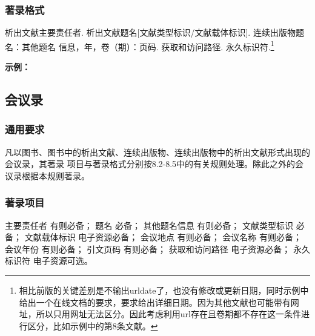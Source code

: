 \documentclass{article}
\begin{document}
\subsubsection{著录格式}

析出文献主要责任者. 析出文献题名[文献类型标识/文献载体标识]. 连续出版物题名：其他题名
信息，年，卷（期）：页码. 获取和访问路径. 永久标识符.\footnote{相比前版的关键差别是不输出urldate了，也没有修改或更新日期，同时示例中给出一个在线文档的要求，要求给出详细日期。因为其他文献也可能带有网址，所以只用网址无法区分。因此考虑利用url存在且卷期都不存在这一条件进行区分，比如示例中的第8条文献。}

\begin{refsection}



\nocite{杨洪升2013-56-75}
\nocite{丁文祥2000--}
\nocite{于潇2012-1518-1523}
\nocite{李炳穆2008-6-12}
\nocite{陈建军2010-93-93,陈缮真2022--,李幼平2010-225-228}
\nocite{张群2024在线,
张群2024出版,
Caplan1993-61-66,
Saito2006-169-176,
DESMARAIS1992-605-609,
Park2010-696-715,
Frese2013-378-398,
Myburg2014-356-362,SANTER2025ANN,SHINOTSUKA2023SAMPLE}



\textbf{示例：}

{\printbibliography[heading=none,env=indentegenv]}
\end{refsection}

\subsection{会议录}

\subsubsection{通用要求}

凡以图书、图书中的析出文献、连续出版物、连续出版物中的析出文献形式出现的会议录，其著录
项目与著录格式分别按8.2-8.5中的有关规则处理。除此之外的会议录根据本规则著录。

\subsubsection{著录项目}

主要责任者 有则必备；
题名 必备；
其他题名信息 有则必备；
文献类型标识 必备；
文献载体标识 电子资源必备；
会议地点 有则必备；
会议名称 有则必备；
会议年份 有则必备；
引文页码 有则必备；
获取和访问路径 电子资源必备；
永久标识符 电子资源可选。
\end{document}
